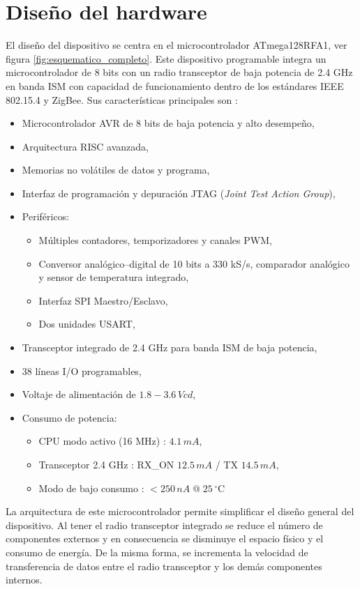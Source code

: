 \section{Diseño del hardware}

El diseño del dispositivo se centra en el microcontrolador ATmega128RFA1\cite{dev:mega128rfa1}, ver figura \ref{fig:esquematico_completo}. Este dispositivo programable integra un microcontrolador de 8 bits con un radio transceptor de baja potencia de 2.4 GHz en banda ISM con capacidad de funcionamiento dentro de los estándares IEEE 802.15.4 y ZigBee. Sus características principales son : 

\begin{itemize}
	\item Microcontrolador AVR de 8 bits de baja potencia y alto desempeño, 
	\item Arquitectura RISC avanzada,
	\item Memorias no volátiles de datos y programa, 
	\item Interfaz de programación y depuración JTAG (\textit{Joint Test Action Group}),
	\item Periféricos:
	\begin{itemize}
		\item Múltiples contadores, temporizadores y canales PWM, 
		\item Conversor analógico--digital de 10 bits a 330 kS/s, comparador analógico y sensor de temperatura integrado,
		\item Interfaz SPI Maestro/Esclavo, 
		\item Dos unidades USART, 
	\end{itemize}
	\item Transceptor integrado de 2.4 GHz para banda ISM de baja potencia,
	\item 38 líneas I/O programables,
	\item Voltaje de alimentación de $ 1.8 - 3.6\,Vcd $,
	\item Consumo de potencia:
	\begin{itemize}
		\item CPU modo activo (16 MHz) : $4.1\,mA$, 
		\item Transceptor 2.4 GHz : RX\_ON $12.5\,mA$ / TX $14.5\,mA$, 
		\item Modo de bajo consumo : $<250\,nA\; @\; 25\,^{\circ}\mathrm{C}$
	\end{itemize}
\end{itemize}

La arquitectura de este microcontrolador permite simplificar el diseño general del dispositivo. Al tener el radio transceptor integrado se reduce el número de componentes externos y en consecuencia se disminuye el espacio físico y el consumo de energía. De la misma forma, se incrementa la velocidad de transferencia de datos entre el radio transceptor y los demás componentes internos. 

